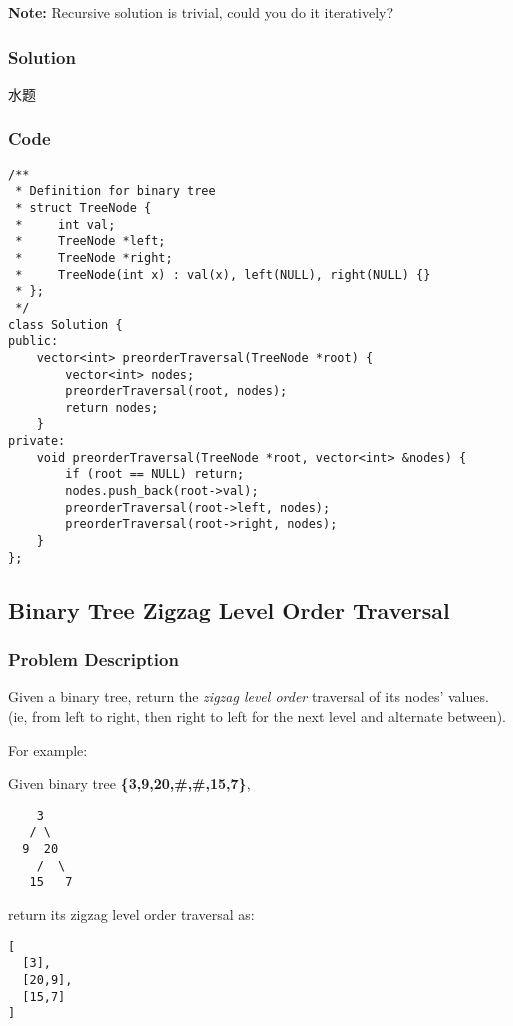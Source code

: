 \documentclass[courier]{article}
\begin{document}
\begin{CJK*}{UTF8}{gkai}
\textbf{Note:} Recursive solution is trivial, could you do it iteratively?



\subsubsection*{Solution}
水题

\subsubsection*{Code}
\begin{lstlisting}
/**
 * Definition for binary tree
 * struct TreeNode {
 *     int val;
 *     TreeNode *left;
 *     TreeNode *right;
 *     TreeNode(int x) : val(x), left(NULL), right(NULL) {}
 * };
 */
class Solution {
public:
    vector<int> preorderTraversal(TreeNode *root) {
        vector<int> nodes;
        preorderTraversal(root, nodes);
        return nodes;
    }
private:
    void preorderTraversal(TreeNode *root, vector<int> &nodes) {
        if (root == NULL) return;
        nodes.push_back(root->val);
        preorderTraversal(root->left, nodes);
        preorderTraversal(root->right, nodes);
    }
}; 
\end{lstlisting}


\subsection{ Binary Tree Zigzag Level Order Traversal }

\subsubsection*{Problem Description}
Given a binary tree, return the \emph{zigzag level order} traversal of its nodes' values. (ie, from left to right, then right to left for the next level and alternate between).

For example:


Given binary tree \textbf{\{3,9,20,\#,\#,15,7\}},


\begin{verbatim}
    3
   / \
  9  20
    /  \
   15   7
\end{verbatim}

return its zigzag level order traversal as:


\begin{verbatim}
[
  [3],
  [20,9],
  [15,7]
]
\end{verbatim}


\end{CJK*}
\end{document}
